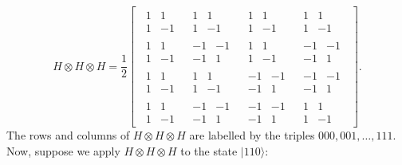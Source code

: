 \documentclass[fleqn]{article}
\begin{document}
\[
  H\otimes H\otimes H
  = \frac{1}{2}
  \left[
  \,
    \begin{array}{c|c|c|c}
      \begin{matrix}1&1\\1&-1\end{matrix}
      & \begin{matrix}1&1\\1&-1\end{matrix}
      & \begin{matrix}1&1\\1&-1\end{matrix}
      & \begin{matrix}1&1\\1&-1\end{matrix}
    \\\hline
      \begin{matrix}1&1\\1&-1\end{matrix}
      & \begin{matrix}-1&-1\\-1&1\end{matrix}
      & \begin{matrix}1&1\\1&-1\end{matrix}
      & \begin{matrix}-1&-1\\-1&1\end{matrix}
    \\\hline
      \begin{matrix}1&1\\1&-1\end{matrix}
      & \begin{matrix}1&1\\1&-1\end{matrix}
      & \begin{matrix}-1&-1\\-1&1\end{matrix}
      & \begin{matrix}-1&-1\\-1&1\end{matrix}
    \\\hline
      \begin{matrix}1&1\\1&-1\end{matrix}
      & \begin{matrix}-1&-1\\-1&1\end{matrix}
      & \begin{matrix}-1&-1\\-1&1\end{matrix}
      & \begin{matrix}1&1\\1&-1\end{matrix}
    \end{array}
  \,
  \right].
\]
The rows and columns of \(H\otimes H\otimes H\) are labelled by the triples \(000,001,\ldots,111\).
Now, suppose we apply \(H\otimes H\otimes H\) to the state \(|110\rangle\):
\end{document}
